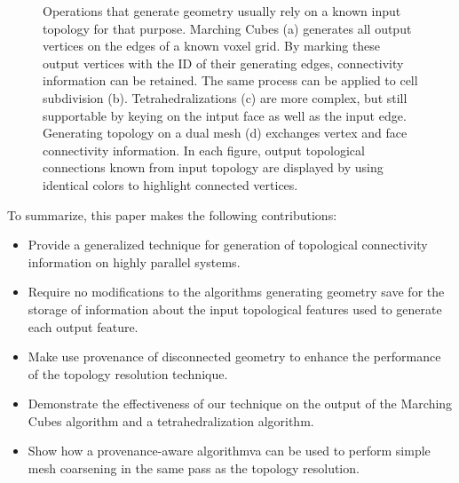 \documentclass[10pt,journal,cspaper,compsoc]{IEEEtran}
\begin{document}
\begin{figure}[!tb]
\caption{Operations that generate geometry usually rely on a known input topology for that purpose. Marching Cubes (a) generates all output vertices on the edges of a known voxel grid. By marking these output vertices with the ID of their generating edges, connectivity information can be retained. The same process can be applied to cell subdivision (b). Tetrahedralizations (c) are more complex, but still supportable by keying on the intput face as well as the input edge. Generating topology on a dual mesh (d) exchanges vertex and face connectivity information. In each figure, output topological connections known from input topology are displayed by using identical colors to highlight connected vertices.}
\label{fig:teaser}
\end{figure}

\noindent
\begin{minipage}{\linewidth}
To summarize, this paper makes the following contributions:
\begin{itemize}
	\item{Provide a generalized technique for generation of topological connectivity information on highly parallel systems.}
	\item{Require no modifications to the algorithms generating geometry save for the
		storage of information about the input topological features used to generate each output feature.}

	\item{Make use provenance of disconnected geometry to enhance the performance of the topology
		resolution technique.}

	\item{Demonstrate the effectiveness of our technique on the output of the Marching Cubes
		algorithm and a tetrahedralization algorithm.}
 
	\item{Show how a provenance-aware algorithmva can be used to perform
		 simple mesh coarsening in the same pass as the topology resolution.}
 
\end{itemize}
\vspace{5mm}
\end{minipage}
\end{document}
